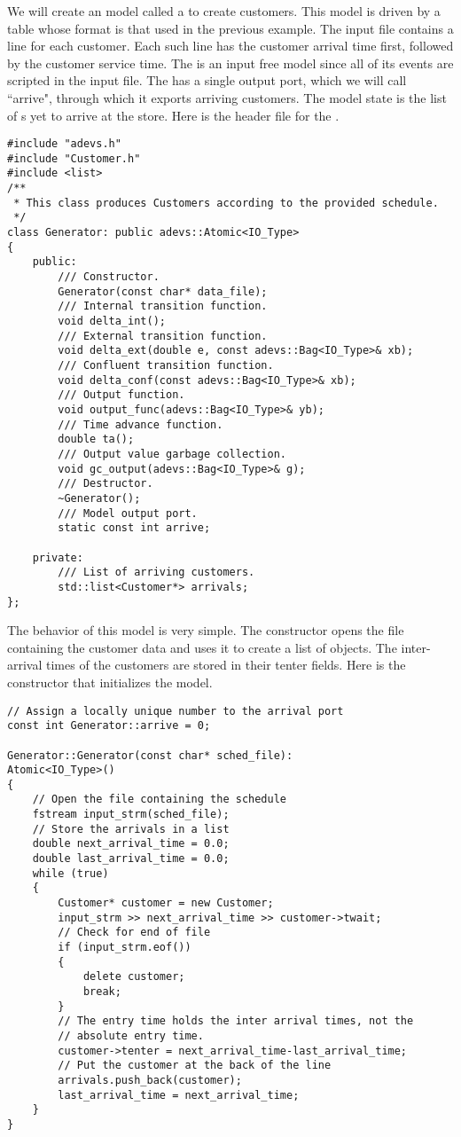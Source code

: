We will create an  model called a  to create customers. This model is driven by a table whose format is that used in the previous example. The input file contains a line for each customer. Each such line has the customer arrival time first, followed by the customer service time. The  is an input free model since all of its events are scripted in the input file. The  has a single output port, which we will call ``arrive", through which it exports arriving customers. The model state is the list of s yet to arrive at the store. Here is the header file for the .
\begin{verbatim}
#include "adevs.h"
#include "Customer.h"
#include <list>
/**
 * This class produces Customers according to the provided schedule.
 */
class Generator: public adevs::Atomic<IO_Type> 
{
    public:
        /// Constructor.
        Generator(const char* data_file);
        /// Internal transition function.
        void delta_int();
        /// External transition function.
        void delta_ext(double e, const adevs::Bag<IO_Type>& xb);
        /// Confluent transition function.
        void delta_conf(const adevs::Bag<IO_Type>& xb);
        /// Output function.  
        void output_func(adevs::Bag<IO_Type>& yb);
        /// Time advance function.
        double ta();
        /// Output value garbage collection.
        void gc_output(adevs::Bag<IO_Type>& g);
        /// Destructor.
        ~Generator();
        /// Model output port.
        static const int arrive;

    private:    
        /// List of arriving customers.
        std::list<Customer*> arrivals;
}; 
\end{verbatim}

The behavior of this model is very simple. The constructor opens the file containing the customer data and uses it to create a list of  objects. The inter-arrival times of the customers are stored in their tenter fields. Here is the constructor that initializes the model.
\begin{verbatim}
// Assign a locally unique number to the arrival port
const int Generator::arrive = 0;

Generator::Generator(const char* sched_file):
Atomic<IO_Type>()
{
    // Open the file containing the schedule
    fstream input_strm(sched_file);
    // Store the arrivals in a list
    double next_arrival_time = 0.0;
    double last_arrival_time = 0.0;
    while (true)
    {
        Customer* customer = new Customer;
        input_strm >> next_arrival_time >> customer->twait;
        // Check for end of file
        if (input_strm.eof())
        {
            delete customer;
            break;
        }
        // The entry time holds the inter arrival times, not the
        // absolute entry time.
        customer->tenter = next_arrival_time-last_arrival_time;
        // Put the customer at the back of the line
        arrivals.push_back(customer);
        last_arrival_time = next_arrival_time;
    }
}
\end{verbatim}

